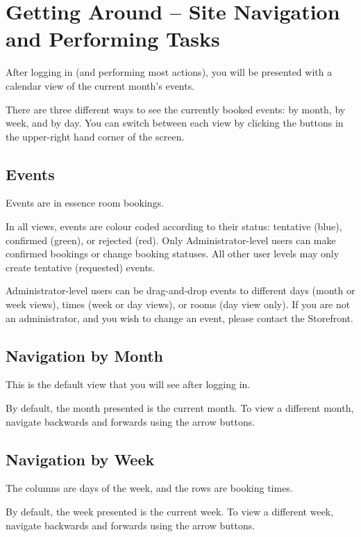 \section{Getting Around -- Site Navigation and Performing Tasks}

After logging in (and performing most actions), you will be presented with a calendar view of the current month's events.

There are three different ways to see the currently booked events: by month, by week, and by day. You can switch between each view by clicking the buttons in the upper-right hand corner of the screen.


\subsection{Events}

Events are in essence room bookings.

In all views, events are colour coded according to their status: tentative (blue), confirmed (green), or rejected (red). Only Administrator-level users can make confirmed bookings or change booking statuses. All other user levels may only create tentative (requested) events.

Administrator-level users can be drag-and-drop events to different days (month or week views), times (week or day views), or rooms (day view only). If you are not an administrator, and you wish to change an event, please contact the Storefront.




\subsection{Navigation by Month}

This is the default view that you will see after logging in.

By default, the month presented is the current month. To view a different month, navigate backwards and forwards using the arrow buttons.


\subsection{Navigation by Week}

The columns are days of the week, and the rows are booking times.

By default, the week presented is the current week. To view a different week, navigate backwards and forwards using the arrow buttons.


